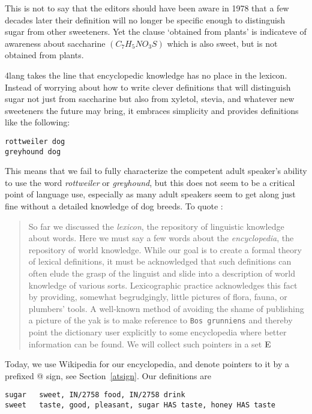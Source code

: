 \documentclass[11pt,bookmarks,bookmarksnumbered,naturalnames,plainpages=false,pdftex,colorlinks=true,urlcolor=blue,bookmarksdepth=subsection,plainpages=false]{paper}
\begin{document}
This is not to say that the editors should have been aware in 1978 that a few
decades later their definition will no longer be specific enough to
distinguish sugar from other sweeteners. Yet the clause `obtained from
plants' is indicateve of awareness about saccharine $(C_7H_5NO_3S)$ which is
also sweet, but is not obtained from plants.  

4lang takes the line that encyclopedic knowledge has no place in the
lexicon. Instead of worrying about how to write clever definitions that will
distinguish sugar not just from saccharine but also from xyletol, stevia, and
whatever new sweeteners the future may bring, it embraces simplicity and
provides definitions like the following:

\begin{verbatim} 
rottweiler dog
greyhound dog
\end{verbatim}

\noindent
This means that we fail to fully characterize the competent adult speaker's
ability to use the word {\it rottweiler} or {\it greyhound}, but this does not
seem to be a critical point of language use, especially as many adult speakers
seem to get along just fine without a detailed knowledge of dog breeds. To
quote \cite{Kornai:2010}:

\begin{quote}
So far we discussed the {\it lexicon}, the repository of linguistic knowledge
about words. Here we must say a few words about the {\it encyclopedia}, the
repository of world knowledge. While our goal is to create a formal theory of
lexical definitions, it must be acknowledged that such definitions can often
elude the grasp of the linguist and slide into a description of world
knowledge of various sorts.  Lexicographic practice acknowledges this fact by
providing, somewhat begrudgingly, little pictures of flora, fauna, or
plumbers' tools. A well-known method of avoiding the shame of publishing a
picture of the yak is to make reference to {\tt Bos grunniens} and thereby
point the dictionary user explicitly to some encyclopedia where better
information can be found. We will collect such pointers in a set {\bf E}
\end{quote}

\noindent
Today, we use Wikipedia for our encyclopedia, and denote pointers to it by a
prefixed @ sign, see Section~\ref{atsign}. Our definitions are 

\begin{verbatim} 
sugar	sweet, IN/2758 food, IN/2758 drink
sweet	taste, good, pleasant, sugar HAS taste, honey HAS taste
\end{verbatim}
\end{document}
